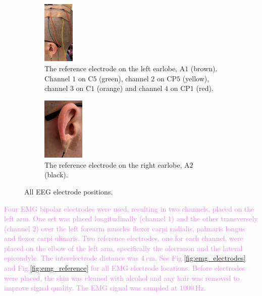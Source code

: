 \begin{figure}
	\centering
	\begin{subfigure}[b]{0.45\columnwidth}
		\centering
		\includegraphics[height=3cm]{figures/eeg_left.jpg}
		\caption{The reference electrode on the left earlobe, $\text{A}1$ (brown). Channel $1$ on $\text{C}5$ (green), channel $2$ on $\text{CP}5$ (yellow), channel $3$ on $\text{C}1$ (orange) and channel $4$ on $\text{CP}1$ (red).}
		\label{fig:eeg_left}
	\end{subfigure}
    \begin{subfigure}[b]{0.45\columnwidth}
		\centering
		\includegraphics[height=3cm]{figures/eeg_right.jpg}
		\caption{The reference electrode on the right earlobe, $\text{A}2$ (black).}
		\label{fig:eeg_right}
	\end{subfigure}
    \hfill
	\caption{All EEG electrode positions.}
	\label{fig:eeg_electrodes}
\end{figure}

\textcolor{violet}{Four EMG bipolar electrodes were used, resulting in two channels, placed on the left arm. One set was placed longitudinally (channel $1$) and the other transversely (channel $2$) over the left forearm muscles flexor carpi radialis, palmaris longus and flexor carpi ulinaris. Two reference electrodes, one for each channel, were placed on the elbow of the left arm, specifically the olecranon and the lateral epicondyle. The interelectrode distance was $4\:\text{cm}$. See Fig.\:\ref{fig:emg_electrodes} and Fig.\:\ref{fig:emg_reference} for all EMG electrode locations. Before electrodes were placed, the skin was cleaned with alcohol and any hair was removed to improve signal quality\:\cite{khanSelectionFeaturesClassifiers2020}. The EMG signal was sampled at $1000\:\text{Hz}$.}

